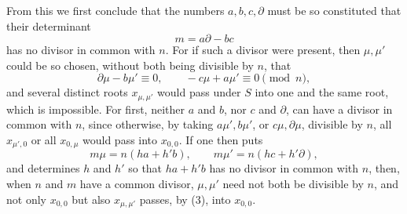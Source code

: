 \documentclass[11pt]{article}
\begin{document}
From this we first conclude that the numbers $a,b,c,\partial$ must be so constituted that
their determinant
\begin{equation}
 m=a\partial-bc
\tag{4}
\end{equation}
has no divisor in common with $n$. For if such a divisor were present, then $\mu,\mu'$ could
be so chosen, without both being divisible by $n$, that
\[
 \partial\mu-b\mu'\equiv0,
 \qquad -c\mu+a\mu'\equiv0\pmod n,
\]
and several distinct roots $x_{\mu,\mu'}$ would pass under $S$ into one and the same root,
which is impossible. For first, neither $a$ and $b$, nor $c$ and $\partial$, can have a divisor
in common with $n$, since otherwise, by taking $a\mu',b\mu'$, or $c\mu,\partial\mu$, divisible
by $n$, all $x_{\mu',0}$ or all $x_{0,\mu}$ would pass into $x_{0,0}$. If one then puts
\[
 m\mu=n(h a+h' b),\qquad m\mu'=n(h c+h'\partial),
\]
and determines $h$ and $h'$ so that $ha+h'b$ has no divisor in common with $n$, then,
when $n$ and $m$ have a common divisor, $\mu,\mu'$ need not both be divisible by $n$, and
not only $x_{0,0}$ but also $x_{\mu,\mu'}$ passes, by (3), into $x_{0,0}$.
\end{document}
